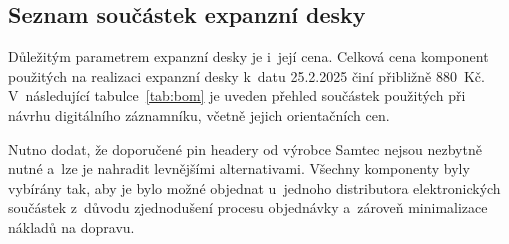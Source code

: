 \newpage


\subsection{Seznam součástek expanzní desky}
\label{bom_list}

Důležitým parametrem expanzní desky je i~její cena. Celková cena komponent použitých na realizaci expanzní desky k~datu 25.2.2025 činí přibližně 880~Kč. V~následující tabulce~\ref{tab:bom} je uveden přehled součástek použitých při návrhu digitálního záznamníku, včetně jejich orientačních cen. 

Nutno dodat, že doporučené pin headery od výrobce Samtec nejsou nezbytně nutné a~lze je nahradit levnějšími alternativami. Všechny komponenty byly vybírány tak, aby je bylo možné objednat u~jednoho distributora elektronických součástek z~důvodu zjednodušení procesu objednávky a~zároveň minimalizace nákladů na dopravu.

